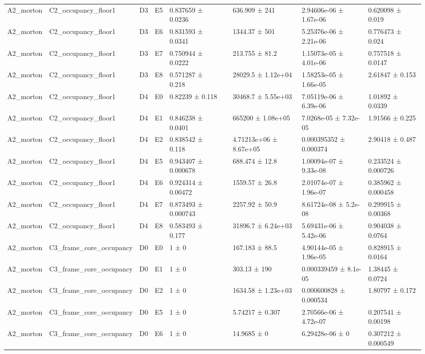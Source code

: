 \begin{table}
\begin{tabular}{lllllllll}
A2\_morton & C2\_occupancy\_floor1 & D3 & E5 & 0.837659 ± 0.0236 &  & 636.909 ± 241 & 2.94606e-06 ± 1.67e-06 & 0.620098 ± 0.019 \\
A2\_morton & C2\_occupancy\_floor1 & D3 & E6 & 0.831593 ± 0.0341 &  & 1344.37 ± 501 & 5.25376e-06 ± 2.21e-06 & 0.776473 ± 0.024 \\
A2\_morton & C2\_occupancy\_floor1 & D3 & E7 & 0.750944 ± 0.0222 &  & 213.755 ± 81.2 & 1.15073e-05 ± 4.01e-06 & 0.757518 ± 0.0147 \\
A2\_morton & C2\_occupancy\_floor1 & D3 & E8 & 0.571287 ± 0.218 &  & 28029.5 ± 1.12e+04 & 1.58253e-05 ± 1.66e-05 & 2.61847 ± 0.153 \\
A2\_morton & C2\_occupancy\_floor1 & D4 & E0 & 0.82239 ± 0.118 &  & 30468.7 ± 5.55e+03 & 7.05119e-06 ± 6.39e-06 & 1.01892 ± 0.0339 \\
A2\_morton & C2\_occupancy\_floor1 & D4 & E1 & 0.846238 ± 0.0401 &  & 665200 ± 1.08e+05 & 7.0268e-05 ± 7.32e-05 & 1.91566 ± 0.225 \\
A2\_morton & C2\_occupancy\_floor1 & D4 & E2 & 0.838542 ± 0.118 &  & 4.71213e+06 ± 8.67e+05 & 0.000395352 ± 0.000374 & 2.90418 ± 0.487 \\
A2\_morton & C2\_occupancy\_floor1 & D4 & E5 & 0.943407 ± 0.000678 &  & 688.474 ± 12.8 & 1.00094e-07 ± 9.33e-08 & 0.233524 ± 0.000726 \\
A2\_morton & C2\_occupancy\_floor1 & D4 & E6 & 0.924314 ± 0.00472 &  & 1559.57 ± 26.8 & 2.01074e-07 ± 1.96e-07 & 0.385962 ± 0.000458 \\
A2\_morton & C2\_occupancy\_floor1 & D4 & E7 & 0.873493 ± 0.000743 &  & 2257.92 ± 50.9 & 8.61724e-08 ± 5.2e-08 & 0.299915 ± 0.00368 \\
A2\_morton & C2\_occupancy\_floor1 & D4 & E8 & 0.583493 ± 0.177 &  & 31896.7 ± 6.24e+03 & 5.69431e-06 ± 5.42e-06 & 0.904038 ± 0.0764 \\
A2\_morton & C3\_frame\_core\_occupancy & D0 & E0 & 1 ± 0 &  & 167.183 ± 88.5 & 4.90144e-05 ± 1.96e-05 & 0.828915 ± 0.0164 \\
A2\_morton & C3\_frame\_core\_occupancy & D0 & E1 & 1 ± 0 &  & 303.13 ± 190 & 0.000339459 ± 8.1e-05 & 1.38445 ± 0.0724 \\
A2\_morton & C3\_frame\_core\_occupancy & D0 & E2 & 1 ± 0 &  & 1634.58 ± 1.23e+03 & 0.000600828 ± 0.000534 & 1.80797 ± 0.172 \\
A2\_morton & C3\_frame\_core\_occupancy & D0 & E5 & 1 ± 0 &  & 5.74217 ± 0.307 & 2.70566e-06 ± 4.72e-07 & 0.207541 ± 0.00198 \\
A2\_morton & C3\_frame\_core\_occupancy & D0 & E6 & 1 ± 0 &  & 14.9685 ± 0 & 6.29428e-06 ± 0 & 0.307212 ± 0.000549 \\

\end{tabular}
\end{table}
